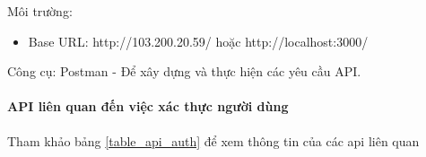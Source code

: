 Môi trường: 

\begin{adjustwidth}{1.5em}{}
\begin{itemize}
  \item Base URL: http://103.200.20.59/ hoặc http://localhost:3000/
\end{itemize}
\end{adjustwidth}

Công cụ: Postman - Để xây dựng và thực hiện các yêu cầu API.

\paragraph{API liên quan đến việc xác thực người dùng}
\mbox{}

Tham khảo bảng \ref{table_api_auth} để xem thông tin của các api liên quan


